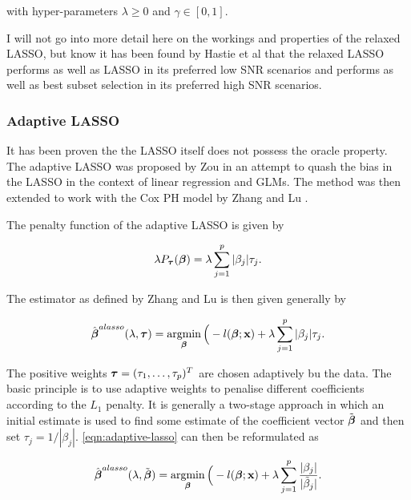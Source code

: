 with hyper-parameters $\lambda\geq0$ and $\gamma\in[0,1]$.

I will not go into more detail here on the workings and properties of the relaxed LASSO, but know it has been found by Hastie et al  that the relaxed LASSO performs as well as LASSO in its preferred low SNR scenarios and performs as well as best subset selection in its preferred high SNR scenarios.

\subsubsection{Adaptive LASSO}

It has been proven the the LASSO itself does not possess the oracle property. The adaptive LASSO was proposed by Zou  in an attempt to quash the bias in the LASSO in the context of linear regression and GLMs. The method was then extended to work with the Cox PH model by Zhang and Lu .

The penalty function of the adaptive LASSO is given by

\begin{equation}
    \lambda P_{\boldsymbol{\tau}}(\boldsymbol{\beta}) = \lambda\sum_{j=1}^p|\beta_j|\tau_j.
\end{equation}

The estimator as defined by Zhang and Lu  is then given generally by

\begin{equation}\label{eqn:adaptive-lasso}
    \hat{\boldsymbol{\beta}}^{alasso}(\lambda,\boldsymbol{\tau})=\operatorname*{argmin}_{\boldsymbol{\beta}}\Big(-l(\boldsymbol{\beta};\textbf{x})+\lambda\sum_{j=1}^p|\beta_j|\tau_j.
\end{equation}

The positive weights $\boldsymbol{\tau}=(\tau_1,\ldots,\tau_p)^T$ are chosen adaptively bu the data. The basic principle is to use adaptive weights to penalise different coefficients according to the $L_1$ penalty. It is generally a two-stage approach in which an initial estimate is used to find some estimate of the coefficient vector $\Tilde{\boldsymbol{\beta}}$ and then set $\tau_j = 1/|\beta_j|$. \cref{eqn:adaptive-lasso} can then be reformulated as

\begin{equation}\label{eqn:adaptive-lasso-reform}
    \hat{\boldsymbol{\beta}}^{alasso}(\lambda,\Tilde{\boldsymbol{\beta}})=\operatorname*{argmin}_{\boldsymbol{\beta}}\Big(-l(\boldsymbol{\beta};\textbf{x})+\lambda\sum_{j=1}^p\frac{|\beta_j|}{|\Tilde{\beta}_j|}.
\end{equation}

